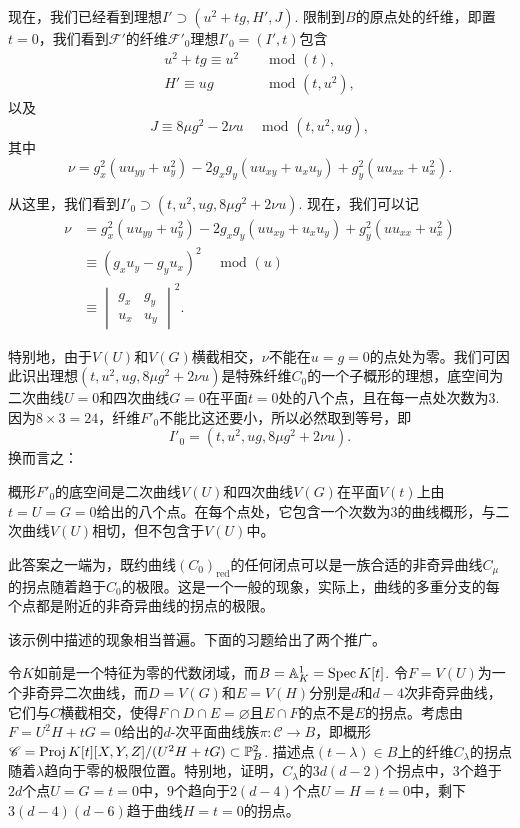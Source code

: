 现在，我们已经看到理想$I'\supset (u^2+tg,H',J)$. 限制到$B$的原点处的纤维，即置$t=0$，我们看到$\mathscr F'$的纤维$\mathscr F'_0$理想$I'_0=(I',t)$包含
\[
	\begin{aligned}
		u^2+tg \equiv u^2 &\quad \text{ mod } (t),\\
		H' \equiv ug &\quad \text{ mod } (t,u^2),
	\end{aligned}
\]
以及
\[
	J\equiv 8\mu g^2-2\nu u\quad \text{ mod } (t,u^2,ug),
\]
其中
\[
	\nu=g_x^2(uu_{yy}+u_y^2)-2g_xg_y(uu_{xy}+u_xu_y)+g_y^2(uu_{xx}+u_x^2).
\]

从这里，我们看到$I'_0\supset (t,u^2,ug,8\mu g^2+2\nu u)$. 现在，我们可以记
\[
	\begin{aligned}
		\nu &=g_x^2(uu_{yy}+u_y^2)-2g_xg_y(uu_{xy}+u_xu_y)+g_y^2(uu_{xx}+u_x^2)\\
		&\equiv (g_xu_y-g_yu_x)^2\quad \text{ mod } (u)\\
		&\equiv \begin{vmatrix}
			g_x&g_y\\
			u_x&u_y
		\end{vmatrix}^2.
	\end{aligned}
\]

特别地，由于$V(U)$和$V(G)$横截相交，$\nu$不能在$u=g=0$的点处为零。我们可因此识出理想$(t,u^2,ug,8\mu g^2+2\nu u)$是特殊纤维$C_0$的一个子概形的理想，底空间为二次曲线$U=0$和四次曲线$G=0$在平面$t=0$处的八个点，且在每一点处次数为$3$. 因为$8\times 3=24$，纤维$F'_0$不能比这还要小，所以必然取到等号，即
\[
	I'_0=(t,u^2,ug,8\mu g^2+2\nu u).
\]
换而言之：

\begin{pro}\label{pro:4.10}
	概形$F'_0$的底空间是二次曲线$V(U)$和四次曲线$V(G)$在平面$V(t)$上由$t=U=G=0$给出的八个点。在每个点处，它包含一个次数为$3$的曲线概形，与二次曲线$V(U)$相切，但不包含于$V(U)$中。
\end{pro}

此答案之一端为，既约曲线$(C_0)_{\text{red}}$的任何闭点可以是一族合适的非奇异曲线$C_\mu$的拐点随着趋于$C_0$的极限。这是一个一般的现象，实际上，曲线的多重分支的每个点都是附近的非奇异曲线的拐点的极限。

该示例中描述的现象相当普遍。下面的习题给出了两个推广。

\begin{exe}\label{exe:4.11}
	令$K$如前是一个特征为零的代数闭域，而$B=\mathbb A_K^1=\operatorname{Spec} K[t]$. 令$F=V(U)$为一个非奇异二次曲线，而$D=V(G)$和$E=V(H)$分别是$d$和$d-4$次非奇异曲线，它们与$C$横截相交，使得$F\cap D\cap E=\varnothing$且$E\cap F$的点不是$E$的拐点。考虑由$F=U^2H+tG=0$给出的$d$-次平面曲线族$\pi:\mathscr C\to B$，即概形$\mathscr C=\operatorname{Proj} K[t][X,Y,Z]/(U^2H+tG)\subset \mathbb P_B^2$. 描述点$(t-\lambda)\in B$上的纤维$C_\lambda$的拐点随着$\lambda$趋向于零的极限位置。特别地，证明，$C_\lambda$的$3d(d-2)$个拐点中，$3$个趋于$2d$个点$U=G=t=0$中，$9$个趋向于$2(d-4)$个点$U=H=t=0$中，剩下$3(d-4)(d-6)$趋于曲线$H=t=0$的拐点。\nottran
\end{exe}

